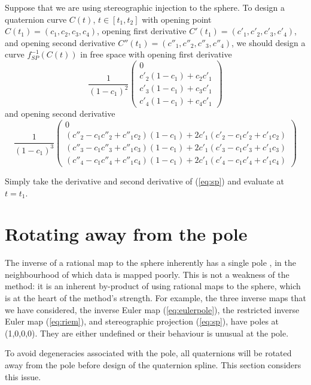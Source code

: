 \documentclass[12pt]{article}
\begin{document}
\begin{lemma}
Suppose that we are using stereographic injection to the sphere.
To design a quaternion curve $C(t)$, $t \in [t_1,t_2]$
with opening point $C(t_1) = (c_1,c_2,c_3,c_4)$, opening first derivative 
$C'(t_1) = (c'_1,c'_2,c'_3,c'_4)$, and opening second derivative 
$C''(t_1) = (c''_1,c''_2,c''_3,c''_4)$,
we should design a curve $f_{SP}^{-1}(C(t))$ in free space with opening first derivative
\[
\frac{1}{(1-c_1)^2}
\left(
\begin{array}{c}
0\\
c'_2(1-c_1) + c_2c'_1\\
c'_3(1-c_1) + c_3c'_1\\
c'_4(1-c_1) + c_4c'_1
\end{array}
\right)
\]
and opening second derivative 
\[
\frac{1}{(1-c_1)^3}
\left(
\begin{array}{c}
0\\
(c''_2 - c_1 c''_2 + c''_1 c_2)(1-c_1) + 2c'_1(c'_2 - c_1 c'_2 + c'_1 c_2)\\
(c''_3 - c_1 c''_3 + c''_1 c_3)(1-c_1) + 2c'_1(c'_3 - c_1 c'_3 + c'_1 c_3)\\
(c''_4 - c_1 c''_4 + c''_1 c_4)(1-c_1) + 2c'_1(c'_4 - c_1 c'_4 + c'_1 c_4)
\end{array}
\right)
\]
\end{lemma}
\prf
Simply take the derivative and second derivative of (\ref{eq:sp}) and evaluate at $t=t_1$.
\QED

\clearpage

\section{Rotating away from the pole} %
\label{sec:pole}

The inverse of a rational map to the sphere inherently has a single pole \cite{jjrm05},
in the neighbourhood of which data is mapped poorly.
This is not a weakness of the method: it is an inherent by-product of using
rational maps to the sphere, which is at the heart of the method's strength.
For example, the three inverse maps that we have considered, 
the inverse Euler map (\ref{eq:eulerpole}),
the restricted inverse Euler map (\ref{eq:riem}), 
and stereographic projection (\ref{eq:sp}), 
have poles at (1,0,0,0).
They are either undefined or their behaviour is unusual at the pole.

To avoid degeneracies associated with the pole, all quaternions 
will be rotated away from the pole before design of the quaternion spline.
This section considers this issue.
\end{document}
